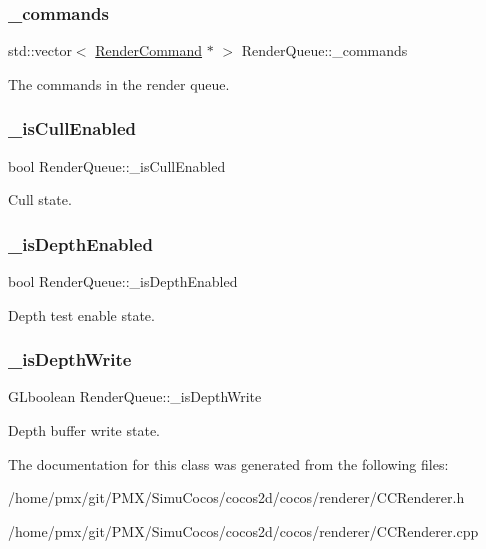 \subsubsection{\texorpdfstring{\+\_\+commands}{\_commands}}
{\footnotesize\ttfamily std\+::vector$<$ \hyperlink{classRenderCommand}{Render\+Command} $\ast$ $>$ Render\+Queue\+::\+\_\+commands\hspace{0.3cm}{\ttfamily [protected]}}

The commands in the render queue. \mbox{\label{classRenderQueue_a559ae66cabf2fe661c2d32d9f1ea77c7}} 
\subsubsection{\texorpdfstring{\+\_\+is\+Cull\+Enabled}{\_isCullEnabled}}
{\footnotesize\ttfamily bool Render\+Queue\+::\+\_\+is\+Cull\+Enabled\hspace{0.3cm}{\ttfamily [protected]}}

Cull state. \mbox{\label{classRenderQueue_a6ee087bd3171e79953ceca457f2c58e1}} 
\subsubsection{\texorpdfstring{\+\_\+is\+Depth\+Enabled}{\_isDepthEnabled}}
{\footnotesize\ttfamily bool Render\+Queue\+::\+\_\+is\+Depth\+Enabled\hspace{0.3cm}{\ttfamily [protected]}}

Depth test enable state. \mbox{\label{classRenderQueue_af8a6675da62368094d61396ef6987877}} 
\subsubsection{\texorpdfstring{\+\_\+is\+Depth\+Write}{\_isDepthWrite}}
{\footnotesize\ttfamily G\+Lboolean Render\+Queue\+::\+\_\+is\+Depth\+Write\hspace{0.3cm}{\ttfamily [protected]}}

Depth buffer write state. 

The documentation for this class was generated from the following files\+:\begin{DoxyCompactItemize}
\item 
/home/pmx/git/\+P\+M\+X/\+Simu\+Cocos/cocos2d/cocos/renderer/C\+C\+Renderer.\+h\item 
/home/pmx/git/\+P\+M\+X/\+Simu\+Cocos/cocos2d/cocos/renderer/C\+C\+Renderer.\+cpp\end{DoxyCompactItemize}
